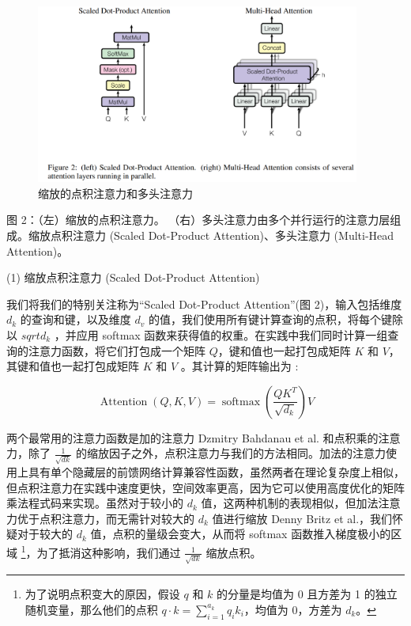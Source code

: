 \begin{figure}[htb]
\centering 
\includegraphics[width=0.95\textwidth]{img/tm2.png} 
\caption{缩放的点积注意力和多头注意力}
\label{Test}
\end{figure}

图 2：（左）缩放的点积注意力。 （右）多头注意力由多个并行运行的注意力层组成。缩放点积注意力 (Scaled Dot-Product Attention)、多头注意力 (Multi-Head Attention)。

(1) 缩放点积注意力 (Scaled Dot-Product Attention)

我们将我们的特别关注称为“Scaled Dot-Product Attention”(图 2)，输入包括维度 $d_{k}$ 的查询和键，以及维度 $d_{v}$ 的值，我们使用所有键计算查询的点积，将每个键除以 $sqrt{d_{k}}$ ，并应用 softmax 函数来获得值的权重。在实践中我们同时计算一组查询的注意力函数，将它们打包成一个矩阵 $Q$，键和值也一起打包成矩阵 $K$ 和 $V$，其键和值也一起打包成矩阵 $K$ 和 $V$ 。其计算的矩阵输出为 :

\begin{equation}
\operatorname{Attention}(Q, K, V)=\operatorname{softmax}\left(\frac{Q K^{T}}{\sqrt{d_{k}}}\right) V
\end{equation}

两个最常用的注意力函数是加的注意力 Dzmitry Bahdanau et al. 和点积乘的注意力，除了 $\frac{1}{\sqrt{d{k}}}$ 的缩放因子之外，点积注意力与我们的方法相同。加法的注意力使用上具有单个隐藏层的前馈网络计算兼容性函数，虽然两者在理论复杂度上相似，但点积注意力在实践中速度更快，空间效率更高，因为它可以使用高度优化的矩阵乘法程式码来实现。虽然对于较小的 $d_{k}$ 值，这两种机制的表现相似，但加法注意力优于点积注意力，而无需针对较大的 $d_{k}$ 值进行缩放 Denny Britz et al.，我们怀疑对于较大的 $d_{k}$ 值，点积的量级会变大，从而将 softmax 函数推入梯度极小的区域 \footnote{为了说明点积变大的原因，假设 $q$ 和 $k$ 的分量是均值为 0 且方差为 1 的独立随机变量，那么他们的点积 $q \cdot k=\sum_{i=1}^{a_{k}} q_{i} k_{i}$，均值为 0，方差为 $d_{k}$。}，为了抵消这种影响，我们通过 $\frac{1}{\sqrt{d{k}}}$ 缩放点积。

